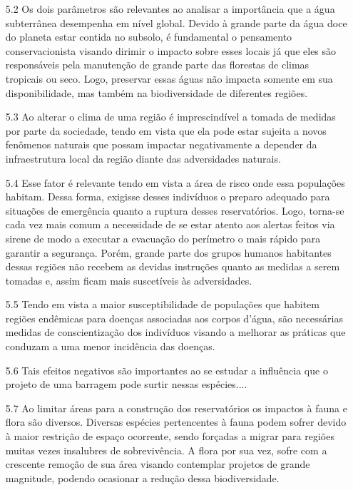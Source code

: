 \documentclass[a4paper, 12pt]{article}
\begin{document}
\begin{enumerate}
        \item[5.2] Os dois parâmetros são relevantes ao analisar a importância que a água subterrânea desempenha em nível global. Devido à grande parte da água doce do planeta estar contida no subsolo, é fundamental o pensamento conservacionista visando dirimir o impacto sobre esses locais já que eles são responsáveis pela manutenção de grande parte das florestas de climas tropicais ou seco. Logo, preservar essas águas não impacta somente em sua disponibilidade, mas também na biodiversidade de diferentes regiões. 
        
        \item[5.3] Ao alterar o clima de uma região é imprescindível a tomada de medidas por parte da sociedade, tendo em vista que ela pode estar sujeita a novos fenômenos naturais que possam impactar negativamente a depender da infraestrutura local da região diante das adversidades naturais. 
        
        \item[5.4] Esse fator é relevante tendo em vista a área de risco onde essa populações habitam. Dessa forma, exigisse desses indivíduos o preparo adequado para situações de emergência quanto a ruptura desses reservatórios. Logo, torna-se cada vez mais comum a necessidade de se estar atento aos alertas feitos via sirene de modo a executar a evacuação do perímetro o mais rápido para garantir a segurança. Porém, grande parte dos grupos humanos habitantes dessas regiões não recebem as devidas instruções quanto as medidas a serem tomadas e, assim ficam mais suscetíveis às adversidades.
        
        \item[5.5] Tendo em vista a maior susceptibilidade de 
        populações que habitem regiões endêmicas para doenças associadas aos corpos d'água, são necessárias medidas de conscientização dos indivíduos visando a melhorar as práticas que conduzam a uma menor incidência das doenças. 
        
        \item[5.6] Tais efeitos negativos são importantes ao se estudar a influência que o projeto de uma barragem pode surtir nessas espécies....
        
        \item[5.7] Ao limitar áreas para a construção dos reservatórios os impactos à fauna e flora são diversos. Diversas espécies pertencentes à fauna podem sofrer devido à maior restrição de espaço ocorrente, sendo forçadas a migrar para regiões muitas vezes insalubres de sobrevivência. A flora por sua vez, sofre com a crescente remoção de sua área visando contemplar projetos de grande magnitude, podendo ocasionar a redução dessa biodiversidade.
        

\end{enumerate}
\end{document}
